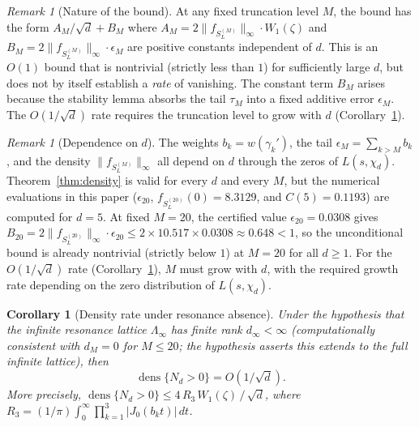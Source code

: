 \documentclass[12pt,reqno]{amsart}
\theoremstyle{plain}
\newtheorem{corollary}[theorem]{Corollary}
\theoremstyle{definition}
\theoremstyle{remark}
\newtheorem{remark}[theorem]{Remark}
\DeclareMathOperator{\dens}{dens}
\begin{document}
\begin{remark}[Nature of the bound]\label{rem:nature}
At any fixed truncation level $M$, the bound has the form $A_M/\sqrt{d} + B_M$ where $A_M = 2\|f_{S_L^{(M)}}\|_\infty \cdot W_1(\zeta)$ and $B_M = 2\|f_{S_L^{(M)}}\|_\infty \cdot \epsilon_M$ are positive constants independent of $d$.  This is an $O(1)$ bound that is nontrivial (strictly less than $1$) for sufficiently large $d$, but does not by itself establish a \emph{rate} of vanishing.  The constant term $B_M$ arises because the stability lemma absorbs the tail $\tau_M$ into a fixed additive error $\epsilon_M$.  The $O(1/\sqrt{d})$ rate requires the truncation level to grow with $d$ (Corollary~\ref{cor:density-rate}).
\end{remark}

\begin{remark}[Dependence on $d$]\label{rem:d-dependence}
The weights $b_k = w(\gamma_k')$, the tail $\epsilon_M = \sum_{k > M} b_k$, and the density $\|f_{S_L^{(M)}}\|_\infty$ all depend on $d$ through the zeros of $L(s,\chi_d)$.  Theorem~\ref{thm:density} is valid for every $d$ and every $M$, but the numerical evaluations in this paper ($\epsilon_{20}$, $f_{S_L^{(20)}}(0) = 8.3129$, and $C(5) = 0.1193$) are computed for $d = 5$.  At fixed $M = 20$, the certified value $\epsilon_{20} = 0.0308$ gives $B_{20} = 2\|f_{S_L^{(20)}}\|_\infty \cdot \epsilon_{20} \leq 2 \times 10.517 \times 0.0308 \approx 0.648 < 1$, so the unconditional bound is already nontrivial (strictly below $1$) at $M = 20$ for all $d \geq 1$.  For the $O(1/\sqrt{d})$ rate (Corollary~\ref{cor:density-rate}), $M$ must grow with $d$, with the required growth rate depending on the zero distribution of $L(s,\chi_d)$.
\end{remark}

\begin{corollary}[Density rate under resonance absence]\label{cor:density-rate}
Under the hypothesis that the infinite resonance lattice $\Lambda_\infty$ has finite rank $d_\infty < \infty$ (computationally consistent with $d_M = 0$ for $M \leq 20$; the hypothesis asserts this extends to the full infinite lattice), then
\[
  \dens\{N_d > 0\} = O(1/\sqrt{d}).
\]
More precisely, $\dens\{N_d > 0\} \leq 4\,R_3\, W_1(\zeta)\, /\, \sqrt{d}$, where $R_3 = (1/\pi)\int_0^\infty \prod_{k=1}^3 |J_0(b_k t)|\, dt$.
\end{corollary}
\end{document}
